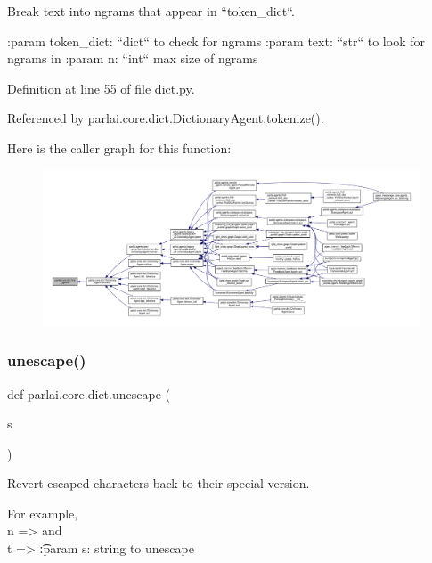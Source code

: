 \begin{DoxyVerb}Break text into ngrams that appear in ``token_dict``.

:param token_dict:
    ``dict`` to check for ngrams
:param text:
    ``str`` to look for ngrams in
:param n:
    ``int`` max size of ngrams
\end{DoxyVerb}
 

Definition at line 55 of file dict.\+py.



Referenced by parlai.\+core.\+dict.\+Dictionary\+Agent.\+tokenize().

Here is the caller graph for this function\+:
\nopagebreak
\begin{figure}[H]
\begin{center}
\leavevmode
\includegraphics[width=350pt]{namespaceparlai_1_1core_1_1dict_a5e9eb43b6c0dce0b3aab7f3ea3717de6_icgraph}
\end{center}
\end{figure}
\mbox{\label{namespaceparlai_1_1core_1_1dict_a4d8952ff127b540967c707a58e8ebb48}} 
\subsubsection{\texorpdfstring{unescape()}{unescape()}}
{\footnotesize\ttfamily def parlai.\+core.\+dict.\+unescape (\begin{DoxyParamCaption}\item[{}]{s }\end{DoxyParamCaption})}

\begin{DoxyVerb}Revert escaped characters back to their special version.

For example, \\n => \n and \\t => \t

:param s:
    string to unescape
\end{DoxyVerb}
 

